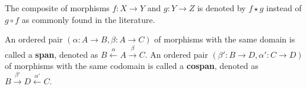 \begin{remark}
    The composite of morphisms \( f: X \mathop{\to} Y \) and \( g: Y \mathop{\to} Z \) is denoted by \( f \mathop{\star} g \) instead of \( g \circ f \) as commonly found in the literature.
\end{remark}



\begin{definition}
    An ordered pair \(( \alpha : A \mathop{\to} B, \beta : A \mathop{\to} C )\) of morphisms with the same domain is called a \textbf{span}, denoted as \( B \overset{\alpha}{\leftarrow} A \overset{\beta}{\rightarrow} C \). 
    An ordered pair \(( \beta' : B \mathop{\to} D, \alpha' : C \mathop{\to} D )\) of morphisms with the same codomain is called a \textbf{cospan}, denoted as \( B \overset{\beta'}{\rightarrow} D \overset{\alpha'}{\leftarrow} C \). 
\end{definition}

